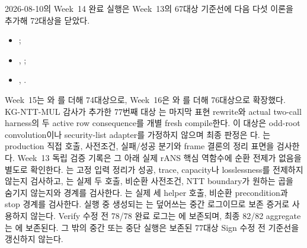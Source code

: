 \begin{boundary}
2026-08-10의 Week~14 완료 실행은 Week~13의 67대상 기준선에 다음 다섯 이론을
추가해 72대상을 닫았다.
\begin{itemize}[leftmargin=1.5em,itemsep=0.05em,topsep=0.25em]
  \raggedright
  \item {}\allowbreak{};
  \item {},
        ;
  \item {},
        \allowbreak{}.
\end{itemize}
Week~15는 와
를 더해 74대상으로, Week~16은
와
를 더해 76대상으로 확장했다.
KG-NTT-MUL 감사가 추가한 77번째 대상
\allowbreak{}는 마지막
 표현
rewrite와 actual two-call harness의 두 active row consequence를 개별 fresh
compile한다. 이 대상은 odd-root convolution이나 security-list
adapter를 가정하지 않으며 최종 판정은 다.
\allowbreak
{}는 production 직접 호출,
사전조건, 실패/성공 분기와 frame 결론의 정리 표면을 검사한다. Week~13 독립
검증 기록은 그 아래 실제 rANS 핵심 역함수에 순환 전제가 없음을 별도로
확인한다. \allowbreak
{}는 고정 입력
정리가 성공, trace, capacity나 losslessness를 전제하지 않는지 검사하고,
\allowbreak
{}는 실제 두 호출, 비순환
사전조건, NTT boundary가 원하는 곱을 숨기지 않는지와
 경계를 검사한다.
는 실제 세 helper 호출,
비순환 precondition과 stop 경계를 검사한다. 실행 중 생성되는
는 덮어쓰는 중간 로그이므로 보존 증거로
사용하지 않는다. Verify 수정 전 78/78 완료 로그는
에 보존되며,
최종 82/82 aggregate는 에
보존된다. 그 밖의
중간 또는 중단 실행은 보존된 77대상 Sign 수정 전 기준선을 갱신하지 않는다.
\end{boundary}


